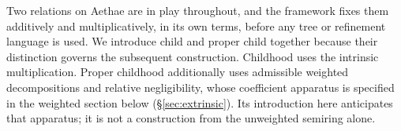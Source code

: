Two relations on Aethae are in play throughout, and the framework fixes them additively and multiplicatively, in its own terms, before any tree or refinement language is used. We introduce child and proper child together because their distinction governs the subsequent construction. Childhood uses the intrinsic multiplication. Proper childhood additionally uses admissible weighted decompositions and relative negligibility, whose coefficient apparatus is specified in the weighted section below (\S\ref{sec:extrinsic}). Its introduction here anticipates that apparatus; it is not a construction from the unweighted semiring alone.

